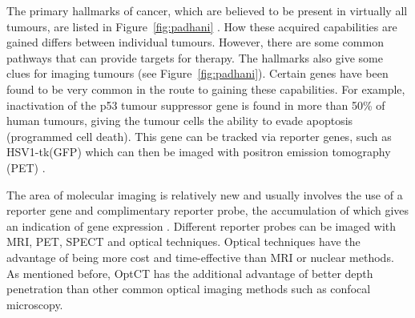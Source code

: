 



The primary hallmarks of cancer, which are believed to be present in virtually all tumours, are listed in Figure~\ref{fig:padhani} \cite{Hanahan:2000}. How these acquired capabilities are gained differs between individual tumours. However, there are some common pathways that can provide targets for therapy. The hallmarks also give some clues for imaging tumours (see Figure~\ref{fig:padhani}). Certain genes have been found to be very common in the route to gaining these capabilities. For example, inactivation of the p53 tumour suppressor gene is found in more than 50\% of  human tumours, giving the tumour cells the ability to evade apoptosis (programmed cell death). This gene can be tracked via reporter genes, such as HSV1-tk(GFP) which can then be imaged with positron emission tomography (PET) \cite{Doubrovin:2001}.  

The area of molecular imaging is relatively new and usually involves the use of a reporter gene and complimentary reporter probe, the accumulation of which gives an indication of gene expression \cite{Blasberg:2003}. Different reporter probes can be imaged with MRI, PET, SPECT and optical techniques. Optical techniques have the advantage of being more cost and time-effective than MRI or nuclear methods. As mentioned before, OptCT has the additional advantage of better depth penetration than other common optical imaging methods such as confocal microscopy.

